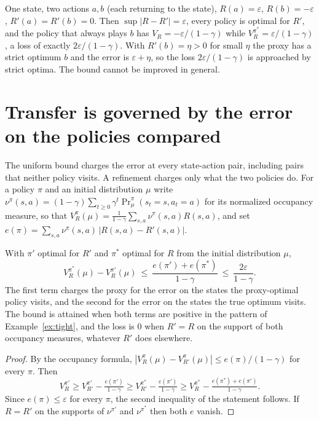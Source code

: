 \begin{example}\label{ex:tight}
One state, two actions $a,b$ (each returning to the state), $R(a)=\varepsilon$, $R(b)=-\varepsilon$, $R'(a)=R'(b)=0$. Then $\sup|R-R'|=\varepsilon$, every policy is optimal for $R'$, and the policy that always plays $b$ has $V_R=-\varepsilon/(1-\gamma)$ while $V_R^{\pi^*}=\varepsilon/(1-\gamma)$, a loss of exactly $2\varepsilon/(1-\gamma)$. With $R'(b)=\eta>0$ for small $\eta$ the proxy has a strict optimum $b$ and the error is $\varepsilon+\eta$, so the loss $2\varepsilon/(1-\gamma)$ is approached by strict optima. The bound cannot be improved in general.
\end{example}

\section{Transfer is governed by the error on the policies compared}

The uniform bound charges the error at every state-action pair, including pairs that neither policy visits. A refinement charges only what the two policies do. For a policy $\pi$ and an initial distribution $\mu$ write $\nu^{\pi}(s,a)=(1-\gamma)\sum_{t\ge0}\gamma^{t}\Pr_\mu^\pi(s_t=s,a_t=a)$ for its normalized occupancy measure, so that $V_R^\pi(\mu)=\frac1{1-\gamma}\sum_{s,a}\nu^\pi(s,a)R(s,a)$, and set $e(\pi)=\sum_{s,a}\nu^\pi(s,a)\,|R(s,a)-R'(s,a)|$.

\begin{newresult}\label{thm:onpolicy}
With $\pi'$ optimal for $R'$ and $\pi^*$ optimal for $R$ from the initial distribution $\mu$,
\[
V_R^{\pi^*}(\mu)-V_R^{\pi'}(\mu)\ \le\ \frac{e(\pi')+e(\pi^*)}{1-\gamma}\ \le\ \frac{2\varepsilon}{1-\gamma}.
\]
The first term charges the proxy for the error on the states the proxy-optimal policy visits, and the second for the error on the states the true optimum visits. The bound is attained when both terms are positive in the pattern of Example~\ref{ex:tight}, and the loss is $0$ when $R'=R$ on the support of both occupancy measures, whatever $R'$ does elsewhere.
\end{newresult}
\begin{proof}
By the occupancy formula, $|V_R^\pi(\mu)-V_{R'}^\pi(\mu)|\le e(\pi)/(1-\gamma)$ for every $\pi$. Then
\[
V_R^{\pi'}\ge V_{R'}^{\pi'}-\tfrac{e(\pi')}{1-\gamma}\ge V_{R'}^{\pi^*}-\tfrac{e(\pi')}{1-\gamma}\ge V_R^{\pi^*}-\tfrac{e(\pi^*)+e(\pi')}{1-\gamma}.
\]
Since $e(\pi)\le\varepsilon$ for every $\pi$, the second inequality of the statement follows. If $R=R'$ on the supports of $\nu^{\pi'}$ and $\nu^{\pi^*}$ then both $e$ vanish.
\end{proof}


